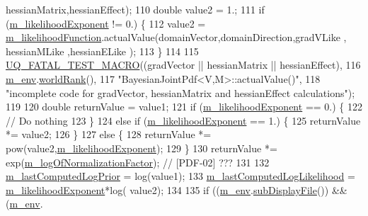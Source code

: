 \begin{DoxyCode}
      hessianMatrix,hessianEffect);
110   \textcolor{keywordtype}{double} value2 = 1.;
111   \textcolor{keywordflow}{if} (\hyperlink{class_q_u_e_s_o_1_1_bayesian_joint_pdf_a511b1e403ebcab436177491ea8f21c07}{m\_likelihoodExponent} != 0.) \{
112     value2 = \hyperlink{class_q_u_e_s_o_1_1_bayesian_joint_pdf_a8e2506801de447f8acd187f8edfa330d}{m\_likelihoodFunction}.actualValue(domainVector,domainDirection,gradVLike ,
      hessianMLike ,hessianELike );
113   \}
114 
115   \hyperlink{_defines_8h_a56d63d18d0a6d45757de47fcc06f574d}{UQ\_FATAL\_TEST\_MACRO}((gradVector || hessianMatrix || hessianEffect),
116                       \hyperlink{class_q_u_e_s_o_1_1_base_scalar_function_adf44141aeb765d97613286f88f235f04}{m\_env}.\hyperlink{class_q_u_e_s_o_1_1_base_environment_a78b57112bbd0e6dd0e8afec00b40ffa7}{worldRank}(),
117                       \textcolor{stringliteral}{"BayesianJointPdf<V,M>::actualValue()"},
118                       \textcolor{stringliteral}{"incomplete code for gradVector, hessianMatrix and hessianEffect calculations"});
119 
120   \textcolor{keywordtype}{double} returnValue = value1;
121   \textcolor{keywordflow}{if} (\hyperlink{class_q_u_e_s_o_1_1_bayesian_joint_pdf_a511b1e403ebcab436177491ea8f21c07}{m\_likelihoodExponent} == 0.) \{
122     \textcolor{comment}{// Do nothing}
123   \}
124   \textcolor{keywordflow}{else} \textcolor{keywordflow}{if} (\hyperlink{class_q_u_e_s_o_1_1_bayesian_joint_pdf_a511b1e403ebcab436177491ea8f21c07}{m\_likelihoodExponent} == 1.) \{
125     returnValue *= value2;
126   \}
127   \textcolor{keywordflow}{else} \{
128     returnValue *= pow(value2,\hyperlink{class_q_u_e_s_o_1_1_bayesian_joint_pdf_a511b1e403ebcab436177491ea8f21c07}{m\_likelihoodExponent});
129   \}
130   returnValue *= exp(\hyperlink{class_q_u_e_s_o_1_1_base_joint_pdf_ae82d4191f17af8c7a26226d127bc7850}{m\_logOfNormalizationFactor}); \textcolor{comment}{// [PDF-02] ???}
131 
132   \hyperlink{class_q_u_e_s_o_1_1_bayesian_joint_pdf_a2b1c5582be60a876a6dd08766e7e31ed}{m\_lastComputedLogPrior}      = log(value1);
133   \hyperlink{class_q_u_e_s_o_1_1_bayesian_joint_pdf_af97f3ff0d65154366e31d14fd88ccb38}{m\_lastComputedLogLikelihood} = \hyperlink{class_q_u_e_s_o_1_1_bayesian_joint_pdf_a511b1e403ebcab436177491ea8f21c07}{m\_likelihoodExponent}*log(
      value2);
134 
135   \textcolor{keywordflow}{if} ((\hyperlink{class_q_u_e_s_o_1_1_base_scalar_function_adf44141aeb765d97613286f88f235f04}{m\_env}.\hyperlink{class_q_u_e_s_o_1_1_base_environment_a8a0064746ae8dddfece4229b9ad374d6}{subDisplayFile}()) && (\hyperlink{class_q_u_e_s_o_1_1_base_scalar_function_adf44141aeb765d97613286f88f235f04}{m\_env}.

\end{DoxyCode}

